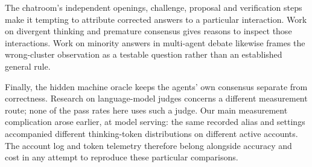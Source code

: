 The chatroom's independent openings, challenge, proposal and verification steps make it tempting to attribute corrected answers to a particular interaction. Work on divergent thinking and premature consensus \citep{Liang2023,Yao2025} gives reasons to inspect those interactions. Work on minority answers in multi-agent debate \citep{He2026} likewise frames the wrong-cluster observation as a testable question rather than an established general rule.

Finally, the hidden machine oracle keeps the agents' own consensus separate from correctness. Research on language-model judges \citep{Zheng2023,Song2026} concerns a different measurement route; none of the pass rates here uses such a judge. Our main measurement complication arose earlier, at model serving: the same recorded alias and settings accompanied different thinking-token distributions on different active accounts. The account log and token telemetry therefore belong alongside accuracy and cost in any attempt to reproduce these particular comparisons.
